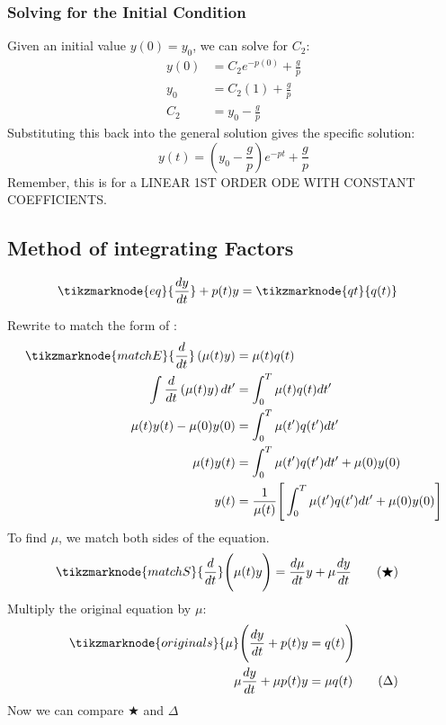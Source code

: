 \documentclass[11pt]{article}
\begin{document}
\subsubsection*{Solving for the Initial Condition}
Given an initial value $y(0) = y_0$, we can solve for $C_2$:
\begin{align*}
    y(0) &= C_2 e^{-p(0)} + \frac{g}{p} \\
    y_0 &= C_2 (1) + \frac{g}{p} \\
    C_2 &= y_0 - \frac{g}{p}
\end{align*}
Substituting this back into the general solution gives the specific solution:
\begin{equation*}
    \boxed{y(t) = \left( y_0 - \frac{g}{p} \right) e^{-pt} + \frac{g}{p}}
\end{equation*}
Remember, this is for a LINEAR 1ST ORDER ODE WITH CONSTANT COEFFICIENTS.

\clearpage
\subsection{Method of integrating Factors}

\begin{align*}
    \tikzmarknode{eq}{\frac{dy}{dt}} + p(t)y &= \tikzmarknode{qt}{q(t)} 
    \end{align*}

Rewrite to match the form of :
\begin{align*}
    \tikzmarknode{matchE}{\frac{d}{dt}}\left(\mu(t)y\right)&=\mu(t)q(t)\\
    \int\frac{d}{dt}\left(\mu(t)y\right)dt'&=\int_{0}^{T}\mu(t)q(t)dt'\\
    \mu(t)y(t)-\mu(0)y(0)&=\int_{0}^{T}\mu(t')q(t')dt'\\
\mu(t)y(t)&=\int_{0}^{T}\mu(t')q(t')dt'+\mu(0)y(0)\\
    y(t)&=\frac{1}{\mu(t)}\Bigg[\int_{0}^{T}\mu(t')q(t')dt'+\mu(0)y(0)\Bigg]\\
\end{align*}
To find $\mu$, we match both sides of the equation.
\begin{align*}
    \tikzmarknode{matchS}{\frac{d}{dt}}\Bigg(\mu(t)y\Bigg)&=\frac{d\mu}{dt}y+\mu \frac{dy}{dt} \tag{$\bigstar$}
\end{align*}
Multiply the original equation by $\mu$:
\begin{align*}
    \tikzmarknode{originals}{\mu}\Bigg(\frac{dy}{dt}+p(t)y&=q(t) \Bigg) \\
    \mu\frac{dy}{dt}+\mu p(t)y&=\mu q(t) \tag{$\Delta$}
\end{align*}
Now we can compare $\bigstar$ and $\Delta$
\end{document}
